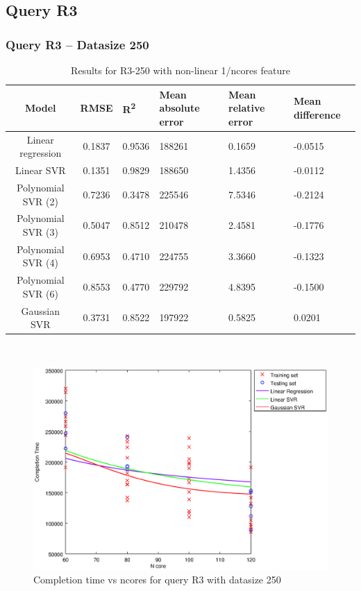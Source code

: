 \documentclass[a4paper,11pt]{article}
\begin{document}
\newpage
\subsection{Query R3}
\subsubsection{Query R3 -- Datasize 250}
\begin{table}[H]
	\centering
	\begin{adjustbox}{center}
		\begin{tabular}{c | c M{1.2cm} M{2.5cm} M{2.5cm} M{1.8cm}}
			Model & RMSE & R\textsuperscript{2} & Mean absolute error & Mean relative error & Mean difference \tabularnewline
			\hline
			Linear regression & 0.1837 & 0.9536 & 188261 & 0.1659 & -0.0515 \\
			Linear SVR & 0.1351 & 0.9829 & 188650 & 1.4356 & -0.0112 \\
			Polynomial SVR (2) & 0.7236 & 0.3478 & 225546 & 7.5346 & -0.2124 \\
			Polynomial SVR (3) & 0.5047 & 0.8512 & 210478 & 2.4581 & -0.1776 \\
			Polynomial SVR (4) & 0.6953 & 0.4710 & 224755 & 3.3660 & -0.1323 \\
			Polynomial SVR (6) & 0.8553 & 0.4770 & 229792 & 4.8395 & -0.1500 \\
			Gaussian SVR & 0.3731 & 0.8522 & 197922 & 0.5825 & 0.0201 \\
		\end{tabular}
	\end{adjustbox}
	\\
	\caption{Results for R3-250 with non-linear 1/ncores feature}
	\label{table_R3_prediction_all}
\end{table}

\begin {figure}[hbtp]
\centering
\includegraphics[width=\textwidth]{output/R3_250_NO_72_90_1_OVER_NCORES/plot_R3_250_bestmodels.eps}
\caption {Completion time vs ncores for query R3 with datasize 250}
\end {figure}
\end{document}
